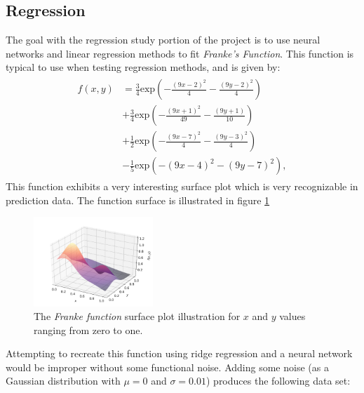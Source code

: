     \subsection{Regression}
        The goal with the regression study portion of the project is to use neural networks and linear regression methods to fit \textit{Franke's Function}. This function is typical to use when testing regression methods, and is given by:
        \begin{align}\label{eq:frankes_function}
            \begin{split}
                f(x, y) &= \frac{3}{4}\text{exp}\left(-\frac{(9x - 2)^2}{4} - \frac{(9y - 2)^2}{4}\right) \\
                &+ \frac{3}{4}\text{exp}\left(-\frac{(9x + 1)^2}{49} - \frac{(9y + 1)}{10}\right) \\
                &+ \frac{1}{2}\text{exp}\left(-\frac{(9x - 7)^2}{4} - \frac{(9y - 3)^2}{4}\right) \\
                &- \frac{1}{5}\text{exp}\left(-(9x - 4)^2 - (9y - 7)^2\right),
            \end{split}
        \end{align}
        This function exhibits a very interesting surface plot which is very recognizable in prediction data. The function surface is illustrated in figure \ref{fig:frankesfunction}
        \begin{figure}[H]
        	\centering
        	\includegraphics[width = 0.4\textwidth]{figures/Franke.png}
        	\caption{The \textit{Franke function} surface plot illustration for $x$ and $y$ values ranging from zero to one.}
        	\label{fig:frankesfunction}
        \end{figure}
       	Attempting to recreate this function using ridge regression and a neural network would be improper without some functional noise. Adding some noise (as a Gaussian distribution with $\mu=0$ and $\sigma=0.01$) produces the following data set:
